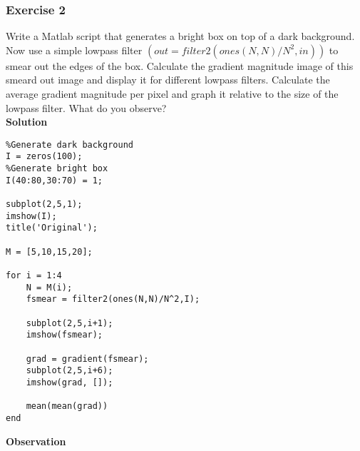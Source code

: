 \subsubsection{Exercise 2}
Write a Matlab script that generates a bright box on top of a dark background. Now use a simple lowpass filter $(out=filter2(ones(N,N)/N^2,in))$ to smear out the edges of the box. Calculate the gradient magnitude image of this smeard out image and display it for different lowpass filters. Calculate the average gradient magnitude per pixel and graph it relative to the size of the lowpass filter. What do you observe?\\
\textbf{Solution}
\begin{lstlisting}
%Generate dark background
I = zeros(100);
%Generate bright box
I(40:80,30:70) = 1;

subplot(2,5,1);
imshow(I);
title('Original');

M = [5,10,15,20];

for i = 1:4
    N = M(i);
    fsmear = filter2(ones(N,N)/N^2,I);

    subplot(2,5,i+1);
    imshow(fsmear);

    grad = gradient(fsmear);
    subplot(2,5,i+6);
    imshow(grad, []);

    mean(mean(grad))
end
\end{lstlisting}
\textbf{Observation}